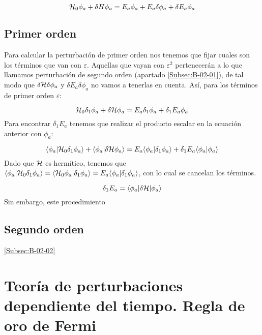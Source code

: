 \begin{equation}
    \mathcal{H}_0 \phi_a + \delta H \phi_a = E_a \phi_a + E_a \delta \phi_a + \delta E_a \phi_a 
\end{equation}

\subsection{Primer orden}

Para calcular la perturbación de primer orden nos tenemos que fijar cuales son los términos que van con $\varepsilon$. Aquellas que vayan con $\varepsilon^2$ pertenecerán a lo que llamamos perturbación de segundo orden (apartado \ref{Subsec:B-02-01}), de tal modo que $\delta\mathcal{H}\delta\phi_a$ y $\delta E_a\delta\phi_a$ no vamos a tenerlas en cuenta. Así, para los términos de primer orden $\varepsilon$:

\begin{equation}
    \mathcal{H}_0 \delta_1 \phi_a + \delta \mathcal{H} \phi_a = E_a \delta_1 \phi_a + \delta_1 E_a \phi_a
\end{equation}
Para encontrar $\delta_1 E_a$ tenemos que realizar el producto escalar en la ecuación anterior con $\phi_a$:

\begin{equation}
    \langle \phi_a | \mathcal{H}_0 \delta_1 \phi_a \rangle + \langle \phi_a | \delta \mathcal{H} \phi_a \rangle = E_a \langle \phi_a |\delta_1 \phi_a \rangle + \delta_1 E_a \langle \phi_a |\phi_a \rangle
\end{equation}
Dado que $\mathcal{H}$ es hermítico, tenemos que $\langle \phi_a |\mathcal{H}_0 \delta_1 \phi_a\rangle = \langle \mathcal{H}_0 \phi_a |\delta_1 \phi_a\rangle = E_a \langle \phi_a |\delta_1 \phi_a \rangle $, con lo cual se cancelan los términos.

\begin{equation}
    \delta_1 E_a = \langle \phi_a |\delta \mathcal{H} |\phi_a\rangle
\end{equation}
Sin embargo, este procedimiento

\subsection{Segundo orden} \ref{Subsec:B-02-02}

\section{Teoría de perturbaciones dependiente del tiempo. Regla de oro de Fermi}

